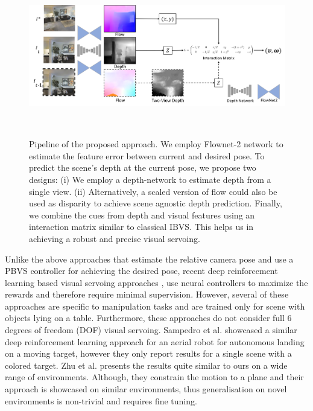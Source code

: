 \documentclass[letterpaper, 10 pt, conference]{ieeeconf}  %
\begin{document}
\begin{figure}[ht!]
    \begin{center}
    \includegraphics[width=17cm, height=7.0cm] {figures/Pipeline_VS.png}
    \caption{Pipeline of the proposed approach. We employ Flownet-2 network to estimate the feature error between current and desired pose. To predict the scene's depth at the current pose, we propose two designs: (i) We employ a depth-network to estimate depth from a single view. (ii) Alternatively, a scaled version of flow could also be used as disparity to achieve scene agnostic depth prediction. Finally, we combine the cues from depth and visual features using an interaction matrix similar to classical IBVS. This helps us in achieving a robust and precise visual servoing.}
    \label{fig:pipeline}
    \end{center}
\end{figure}


\indent Unlike the above approaches that estimate the relative camera pose and use a PBVS controller for achieving the desired pose, recent deep reinforcement learning based visual servoing approaches \cite{sim2real,sim2real2}, \cite{deepq,sefsupervised} use neural controllers to maximize the rewards and therefore require minimal supervision. However, several of these approaches are specific to manipulation tasks and are trained only for scene with objects lying on a table. Furthermore, these approaches do not consider full 6 degrees of freedom (DOF) visual servoing. Sampedro et al.  \cite{deeprlvsdrone} showcased a similar deep reinforcement learning approach for an aerial robot for autonomous landing on a moving target, however they only report results for a single scene with a colored target. Zhu et al. \cite{targetdriven} presents the results quite similar to ours on a wide range of environments. Although, they constrain the motion to a plane and their approach is showcased on similar environments, thus generalisation on novel environments is non-trivial and requires fine tuning. %
\end{document}

